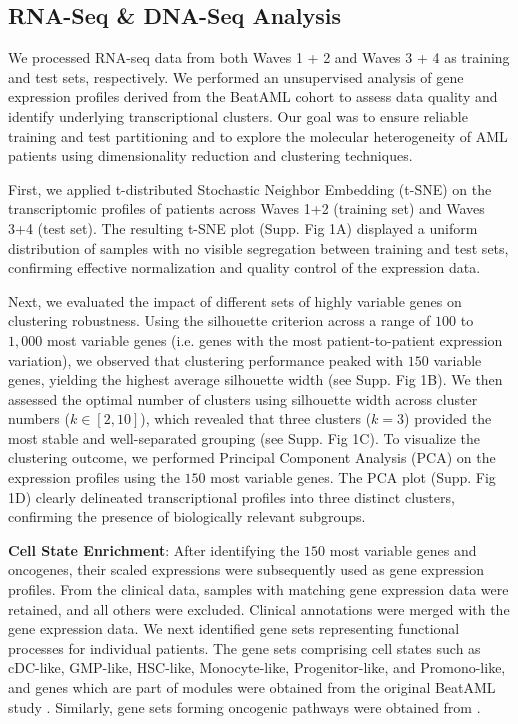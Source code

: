 \documentclass[pdflatex,sn-mathphys-num]{sn-jnl}%
\theoremstyle{thmstyleone}%
\theoremstyle{thmstyletwo}%
\theoremstyle{thmstylethree}%
\begin{document}
\subsection{RNA-Seq \& DNA-Seq Analysis}
We processed RNA-seq data from both Waves 1 + 2 and Waves 3 + 4 as training and test sets, respectively. We performed an unsupervised analysis of gene expression profiles derived from the BeatAML cohort to assess data quality and identify underlying transcriptional clusters. Our goal was to ensure reliable training and test partitioning and to explore the molecular heterogeneity of AML patients using dimensionality reduction and clustering techniques.

First, we applied t-distributed Stochastic Neighbor Embedding (t-SNE) \cite{van2008visualizing} on the transcriptomic profiles of patients across Waves 1+2 (training set) and Waves 3+4 (test set). The resulting t-SNE plot (Supp. Fig 1A) displayed a uniform distribution of samples with no visible segregation between training and test sets, confirming effective normalization and quality control of the expression data. 

Next, we evaluated the impact of different sets of highly variable genes on clustering robustness. Using the silhouette criterion \cite{rousseeuw1987silhouettes} across a range of $100$ to $1,000$ most variable genes (i.e. genes with the most patient-to-patient expression variation), we observed that clustering performance peaked with $150$ variable genes, yielding the highest average silhouette width (see Supp. Fig 1B). We then assessed the optimal number of clusters using silhouette width across cluster numbers ($k \in [2,10]$), which revealed that three clusters ($k=3$) provided the most stable and well-separated grouping (see Supp. Fig 1C). To visualize the clustering outcome, we performed Principal Component Analysis (PCA) on the expression profiles using the $150$ most variable genes. The PCA plot (Supp. Fig 1D) clearly delineated transcriptional profiles into three distinct clusters, confirming the presence of biologically relevant subgroups. 

\textbf{Cell State Enrichment}: After identifying the $150$ most variable genes and oncogenes, their scaled expressions were subsequently used as gene expression profiles. From the clinical data, samples with matching gene expression data were retained, and all others were excluded. Clinical annotations were merged with the gene expression data. We next identified gene sets representing functional processes for individual patients. The gene sets comprising cell states such as cDC-like, GMP-like, HSC-like, Monocyte-like, Progenitor-like, and Promono-like, and genes which are part of modules were obtained from the original BeatAML study \cite{bottomly2022integrative}. Similarly, gene sets forming oncogenic pathways were obtained from \cite{roelands2020oncogenic}. 
\end{document}
